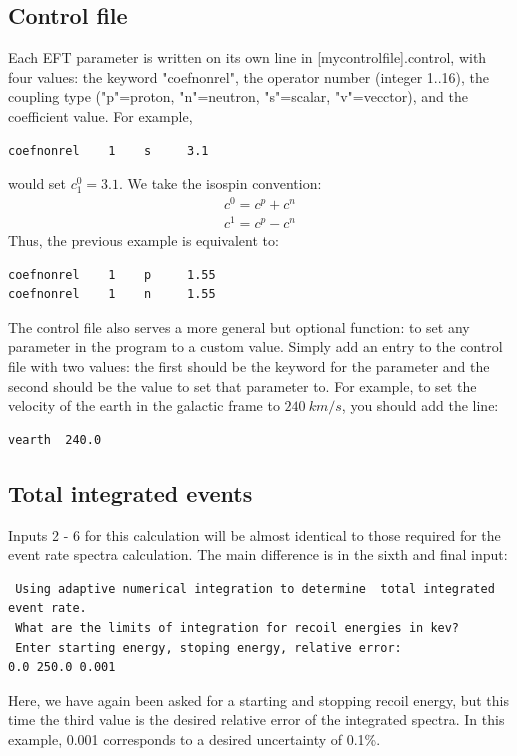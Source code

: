 \documentclass[12pt]{article}
\begin{document}
\subsection{Control file}

Each EFT parameter is written on its own line in [mycontrolfile].control, with
four values: the keyword "coefnonrel", the operator number (integer 1..16), the
coupling type ("p"=proton, "n"=neutron, "s"=scalar, "v"=vecctor), and the
coefficient value. For example, 
\begin{verbatim}
coefnonrel    1    s     3.1
\end{verbatim}
would set $c_1^0 = 3.1$. We take the isospin convention:
\begin{equation}
	\begin{split}
		c^0 = c^p + c^n\\
		c^1 = c^p - c^n
	\end{split}
\end{equation}
Thus, the previous example is equivalent to:
\begin{verbatim}
coefnonrel    1    p     1.55
coefnonrel    1    n     1.55
\end{verbatim}

The control file also serves a more general but optional function: to set any 
parameter in the program to a custom value.  
Simply add an entry to the control file with two values: the first 
should be the keyword for the parameter and the 
second should be the value to set that parameter to. For example, to set the 
velocity of the earth in the galactic frame to $240\ km/s$, you should add the line:
\begin{verbatim}
vearth  240.0
\end{verbatim}

\subsection{Total integrated events}
Inputs 2 - 6 for this calculation will be almost identical to those required for
the event rate spectra calculation. The main difference is in the sixth and
final input:
\begin{verbatim}
 Using adaptive numerical integration to determine  total integrated event rate.
 What are the limits of integration for recoil energies in kev?
 Enter starting energy, stoping energy, relative error:
0.0 250.0 0.001
\end{verbatim}
Here, we have again been asked for a starting and stopping recoil energy, but
this time the third value is the desired relative error of the integrated
spectra. In this example, 0.001 corresponds to a desired uncertainty of 0.1\%. 
\end{document}
